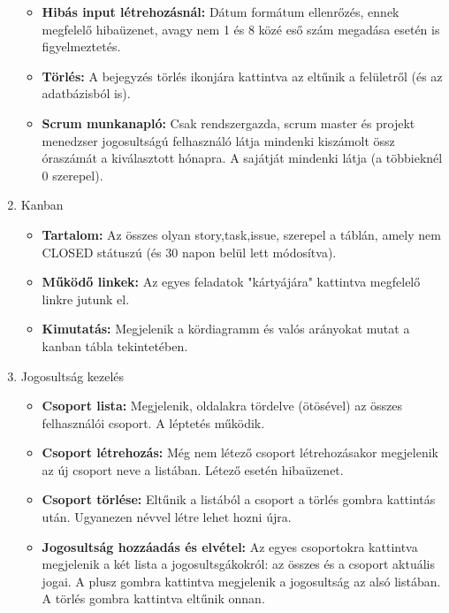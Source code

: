 \begin{enumerate}
\begin{itemize}
		\item \textbf{Hibás input létrehozásnál:} Dátum formátum ellenrőzés, ennek megfelelő hibaüzenet, avagy nem 1 és 8 közé eső szám megadása esetén is figyelmeztetés.
		\item \textbf{Törlés:} A bejegyzés törlés ikonjára kattintva az eltűnik a felületről (és az adatbázisból is).
		\item \textbf{Scrum munkanapló:} Csak rendszergazda, scrum master és projekt menedzser jogosultságú felhasználó látja mindenki kiszámolt össz óraszámát a kiválasztott hónapra. A sajátját mindenki látja (a többieknél 0 szerepel).
	\end{itemize}
	\item Kanban
	\begin{itemize}
		\item \textbf{Tartalom:} Az összes olyan story,task,issue, szerepel a táblán, amely nem CLOSED státuszú (és 30 napon belül lett módosítva).
		\item \textbf{Működő linkek:} Az egyes feladatok "kártyájára" kattintva megfelelő linkre jutunk el.
		\item \textbf{Kimutatás:} Megjelenik a kördiagramm és valós arányokat mutat a kanban tábla tekintetében.
	\end{itemize}
	\item Jogosultság kezelés
	\begin{itemize}
		\item \textbf{Csoport lista:} Megjelenik, oldalakra tördelve (ötösével) az összes felhasználói csoport. A léptetés működik.
		\item \textbf{Csoport létrehozás:} Még nem létező csoport létrehozásakor megjelenik az új csoport neve a listában. Létező esetén hibaüzenet.
		\item \textbf{Csoport törlése:} Eltűnik a listából a csoport a törlés gombra kattintás után. Ugyanezen névvel létre lehet hozni újra.
		\item \textbf{Jogosultság hozzáadás és elvétel:} Az egyes csoportokra kattintva megjelenik a két lista a jogosultsgákokról: az összes és a csoport aktuális jogai. A plusz gombra kattintva megjelenik a jogosultság az alsó listában. A törlés gombra kattintva eltűnik onnan.
	\end{itemize}
\end{enumerate}